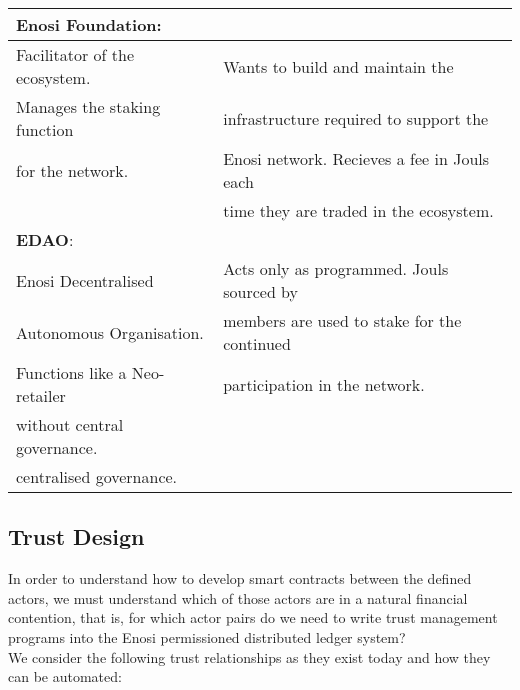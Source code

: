 \documentclass{article}
\theoremstyle{definition}
\theoremstyle{plain} %
\begin{document}
\begin{tabular}{|l|l|}
 \textbf{Enosi Foundation}:		& \\
 \hline 
 Facilitator of the ecosystem.	& Wants to build and maintain the 				\\
 Manages the staking function	& infrastructure required to support the 		\\
 for the network.				& Enosi network. Recieves a fee in Jouls each	\\
 								& time they are traded in the ecosystem.		\\
 \hline 

 \textbf{EDAO}:					& \\
 \hline 
 Enosi Decentralised 			& Acts only as programmed. Jouls sourced by		\\
 Autonomous Organisation.		& members are used to stake for the continued	\\
 Functions like a Neo-retailer	& participation in the network. \\
 without central governance. 	& \\
 centralised governance.		& \\
 \hline
\end{tabular}


\subsection{Trust Design}

In order to understand how to develop smart contracts between the defined actors, we must understand which of those actors are in a natural financial contention, that is, for which actor pairs do we need to write trust management programs into the Enosi permissioned distributed ledger system? \\

\noindent We consider the following trust relationships as they exist today and how they can be automated:
\end{document}
